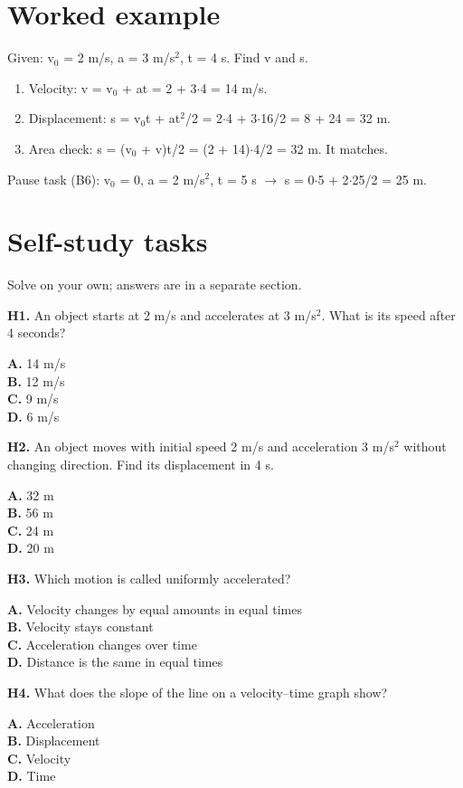 \documentclass[11pt]{article}
\begin{document}
\section*{Worked example}
Given: v$_0$ = 2 m/s, a = 3 m/s$^2$, t = 4 s. Find v and s.
\begin{enumerate}
\item Velocity: v = v$_0$ + at = 2 + 3$\cdot$4 = 14 m/s.
\item Displacement: s = v$_0$t + at$^2$/2 = 2$\cdot$4 + 3$\cdot$16/2 = 8 + 24 = 32 m.
\item Area check: s = (v$_0$ + v)t/2 = (2 + 14)$\cdot$4/2 = 32 m. It matches.
\end{enumerate}
Pause task (B6): v$_0$ = 0, a = 2 m/s$^2$, t = 5 s $\to$ s = 0$\cdot$5 + 2$\cdot$25/2 = 25 m.
\section*{Self-study tasks}
Solve on your own; answers are in a separate section.


\textbf{H1.} An object starts at 2 m/s and accelerates at 3 m/s$^2$. What is its speed after 4 seconds?

\textbf{A.} 14 m/s \\
\textbf{B.} 12 m/s \\
\textbf{C.} 9 m/s \\
\textbf{D.} 6 m/s

\textbf{H2.} An object moves with initial speed 2 m/s and acceleration 3 m/s$^2$ without changing direction. Find its displacement in 4 s.

\textbf{A.} 32 m \\
\textbf{B.} 56 m \\
\textbf{C.} 24 m \\
\textbf{D.} 20 m

\textbf{H3.} Which motion is called uniformly accelerated?

\textbf{A.} Velocity changes by equal amounts in equal times \\
\textbf{B.} Velocity stays constant \\
\textbf{C.} Acceleration changes over time \\
\textbf{D.} Distance is the same in equal times

\textbf{H4.} What does the slope of the line on a velocity–time graph show?

\textbf{A.} Acceleration \\
\textbf{B.} Displacement \\
\textbf{C.} Velocity \\
\textbf{D.} Time
\end{document}

